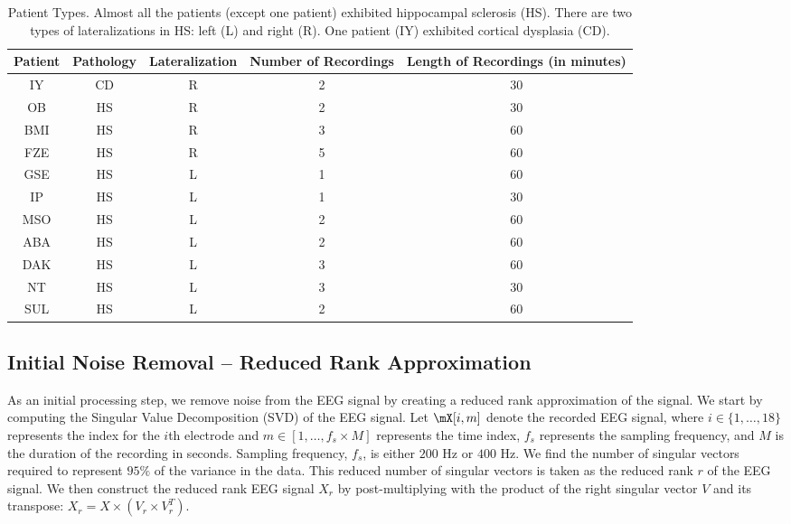 \documentclass{article} %
\theoremstyle{definition}
\theoremstyle{remark}
\begin{document}
\begin{table}[htdp]
\caption{Patient Types. Almost all the patients (except one patient) exhibited hippocampal sclerosis (HS).  
There are two types of lateralizations in HS: left (L) and right (R).  One patient (IY) 
exhibited cortical dysplasia (CD).}
\begin{center}
\begin{tabular}{ccccc}
	Patient & Pathology & Lateralization & Number of Recordings & Length of Recordings (in minutes)\\
	\hline
	IY&CD&R&2&30\\
	OB&HS&R&2&30\\
	BMI&HS&R&3&60\\
	FZE&HS&R&5&60\\
	GSE&HS&L&1&60\\
	IP&HS&L&1&30\\
	MSO	&HS&L&2&60\\	
	ABA&HS&L&2&60\\
	DAK&HS&L&3&60\\
	NT&HS&L&3&30\\
	SUL&HS&L&2&60\\
\end{tabular}
\end{center}
\label{tab:patient_types}
\end{table}

\subsection{Initial Noise Removal -- Reduced Rank Approximation}
As an initial processing step, we remove noise from the EEG signal by creating a reduced rank approximation of the signal.  We start by computing the Singular Value Decomposition (SVD) of the EEG signal.  Let $\mX[i,m]$ denote the recorded EEG signal, where $i\in\{1,\ldots,18\}$ represents the index for the $i$th electrode and $m\in\left[1,\ldots,f_s\times M\right]$ represents the time index, $f_s$ represents the sampling frequency, and $M$ is the duration of the recording in seconds.  Sampling frequency, $f_s$, is either $200$ Hz or $400$ Hz.  We find the number of singular vectors required to represent $95\%$ of the variance in the data.  This reduced number of singular vectors is taken as the reduced rank $r$ of the EEG signal.  We then construct the reduced rank EEG signal $X_r$ by post-multiplying with the product of the right singular vector $V$ and its transpose: $X_r = X\times(V_r \times V_r^T)$.
\end{document}
